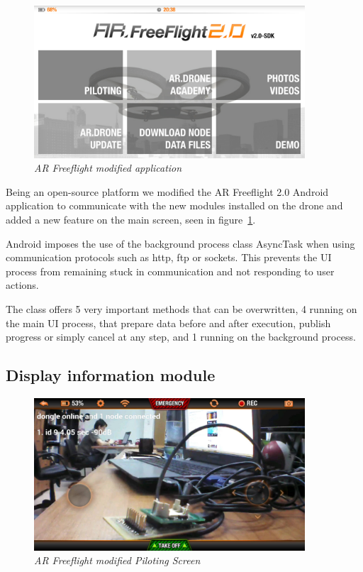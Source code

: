 \begin{figure}[ht]
\begin{center}
\includegraphics[width=0.9\textwidth]{img/android_app.png}
\end{center}
\caption{\small \itshape{AR Freeflight modified application}}
  \label{fig:moded_app}
\end{figure}

Being an open-source platform we modified the AR Freeflight 2.0 Android application to communicate with the new modules installed on the drone and added a new feature on the main screen, seen in figure~\ref{fig:moded_app}.

Android imposes the use of the background process class AsyncTask when using communication protocols such as http, ftp or sockets. This prevents the UI process from remaining stuck in communication and not responding to user actions.

The class offers 5 very important methods that can be overwritten, 4 running on the main UI process, that prepare data before and after execution, publish progress or simply cancel at any step, and 1 running on the background process.

\subsection{Display information module}
 
\begin{figure}[ht]
\begin{center}
\includegraphics[width=0.9\textwidth]{img/android_info.png}
\end{center}
\caption{\small \itshape{AR Freeflight modified Piloting Screen}}
  \label{fig:pilot}
\end{figure}


